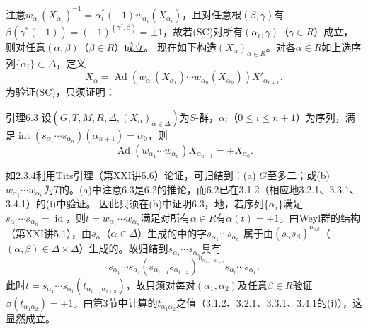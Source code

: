 注意$w_{\alpha_i}(X_{\alpha_i})^{-1}=\alpha_i^*(-1)w_{\alpha_i}(X_{\alpha_i})$，且对任意根$(\beta,\gamma)$有$\beta(\gamma^*(-1))=(-1)^{(\gamma^*,\beta)}=\pm1$，故若(SC)对所有$(\alpha_i,\gamma)$（$\gamma\in R$）成立，则对任意$(\alpha,\beta)$（$\beta\in R$）成立。
现在如下构造$(X_\alpha)_{\alpha\in R}$。对各$\alpha\in R$如上选序列$\{\alpha_i\}\subset\Delta$，定义
\[X_\alpha=\operatorname{Ad}(w_{\alpha_i}(X_{\alpha_1})\cdots w_{\alpha_n}(X_{\alpha_n}))X'_{\alpha_{n+1}}.\]
为验证(SC)，只须证明：
\begin{SGAresult}{引理}{6.3}
设$(G,T,M,R,\Delta,(X_\alpha)_{\alpha\in\Delta})$为$S$-群，$\alpha_i$（$0\leq i\leq n+1$）为序列，满足$\operatorname{int}(s_{\alpha_1}\cdots s_{\alpha_n})(\alpha_{n+1})=\alpha_0$，则
\[\operatorname{Ad}(w_{\alpha_1}\cdots w_{\alpha_n})X_{\alpha_{n+1}}=\pm X_{\alpha_0}.\]
\end{SGAresult}
如2.3.4利用Tits引理（第XXI讲5.6）论证，可归结到：(a) $G$至多二；或(b) $w_{\alpha_1}\cdots w_{\alpha_n}$为$T$的。(a)中注意6.3是6.2的推论，而6.2已在3.1.2（相应地3.2.1、3.3.1、3.4.1）的(i)中验证。
因此只须在(b)中证明6.3，地，若序列$\{\alpha_i\}$满足$s_{\alpha_1}\cdots s_{\alpha_n}=\operatorname{id}$，则$t=w_{\alpha_1}\cdots w_{\alpha_n}$满足对所有$\alpha\in R$有$\alpha(t)=\pm1$。由Weyl群的结构（第XXI讲5.1），由$s_\alpha$（$\alpha\in\Delta$）生成的中的字$s_{\alpha_1}\cdots s_{\alpha_n}$
属于由$(s_\alpha s_\beta)^{n_{\alpha\beta}}$（$(\alpha,\beta)\in\Delta\times\Delta$）生成的。故归结到$s_{\alpha_1}\cdots s_{\alpha_n}$具有
\[s_{\alpha_1}\cdots s_{\alpha_i}(s_{\alpha_{i+1}}s_{\alpha_{i+2}})^{n_{\alpha_{i+1}\alpha_{i+2}}}s_{\alpha_i}\cdots s_{\alpha_1}.\]
此时$t=s_{\alpha_1}\cdots s_{\alpha_i}(t_{\alpha_{i+1}\alpha_{i+2}})$，故只须对每对$(\alpha_1,\alpha_2)$及任意$\beta\in R$验证$\beta(t_{\alpha_1\alpha_2})=\pm1$。由第3节中计算的$t_{\alpha_1\alpha_2}$之值（3.1.2、3.2.1、3.3.1、3.4.1的(i)），这显然成立。
